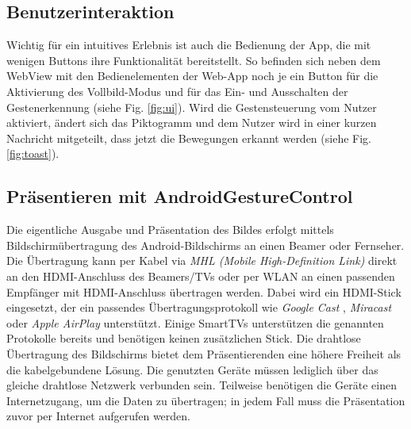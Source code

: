\documentclass{article}
\begin{document}
\subsection{Benutzerinteraktion}
Wichtig für ein intuitives Erlebnis ist auch die Bedienung der App, die mit wenigen Buttons ihre Funktionalität bereitstellt.
So befinden sich neben dem WebView mit den Bedienelementen der Web-App noch je ein Button für die Aktivierung des Vollbild-Modus und für das Ein- und Ausschalten der Gestenerkennung (siehe Fig. \ref{fig:ui}).
Wird die Gestensteuerung vom Nutzer aktiviert, ändert sich das Piktogramm und dem Nutzer wird in einer kurzen Nachricht mitgeteilt, dass jetzt die Bewegungen erkannt werden (siehe Fig. \ref{fig:toast}).

\subsection{Präsentieren mit AndroidGestureControl}
\label{ref:present}
Die eigentliche Ausgabe und Präsentation des Bildes erfolgt mittels Bildschirmübertragung des Android-Bildschirms an einen Beamer oder Fernseher. Die Übertragung kann per Kabel via \textit{MHL (Mobile High-Definition Link)} \cite{mhl} direkt an den HDMI-Anschluss des Beamers/TVs oder per WLAN an einen passenden Empfänger mit HDMI-Anschluss übertragen werden. Dabei wird ein HDMI-Stick eingesetzt, der ein passendes Übertragungsprotokoll wie \textit{Google Cast} \cite{cast}, \textit{Miracast} \cite{ijitr555} oder \textit{Apple AirPlay} \cite{airplay} unterstützt. Einige SmartTVs unterstützen die genannten Protokolle bereits und benötigen keinen zusätzlichen Stick. Die drahtlose Übertragung des Bildschirms bietet dem Präsentierenden eine höhere Freiheit als die kabelgebundene Lösung. Die genutzten Geräte müssen lediglich über das gleiche drahtlose Netzwerk verbunden sein. Teilweise benötigen die Geräte einen Internetzugang, um die Daten zu übertragen; in jedem Fall muss die Präsentation zuvor per Internet aufgerufen werden.
\end{document}
